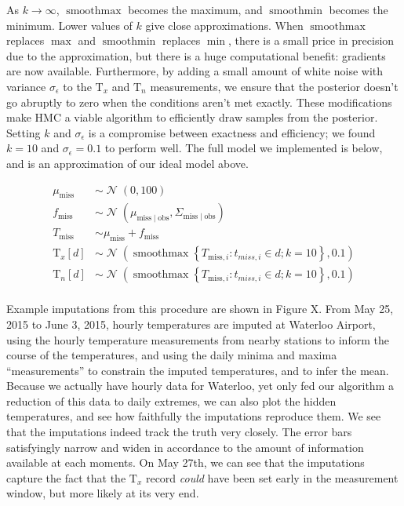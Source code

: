 \documentclass[letter]{article}
\newcommand{\genericdel}[3]{%
      \left#1#3\right#2
    }
\newcommand{\del}[1]{\genericdel(){#1}}
\newcommand{\sbr}[1]{\genericdel[]{#1}}
\newcommand{\cbr}[1]{\genericdel\{\}{#1}}
\DeclareMathOperator{\normal}{\mathcal{N}}
\newcommand{\Tn}{\mathrm{T}_{n}}
\newcommand{\Tx}{\mathrm{T}_{x}}
\newcommand{\miss}{\mathrm{miss}}
\newcommand{\obs}{\mathrm{obs}}
\DeclareMathOperator{\softmax}{smoothmax}
\DeclareMathOperator{\softmin}{smoothmin}
\begin{document}
As \(k \rightarrow \infty\), \(\softmax\) becomes the maximum, and
\(\softmin\) becomes the minimum. Lower values of \(k\) give close
approximations. When \(\softmax\) replaces \(\max\) and \(\softmin\)
replaces \(\min\), there is a small price in precision due to the
approximation, but there is a huge computational benefit: gradients are
now available. Furthermore, by adding a small amount of white noise with
variance \(\sigma_\epsilon\) to the \(\Tx\) and \(\Tn\) measurements, we
ensure that the posterior doesn't go abruptly to zero when the
conditions aren't met exactly. These modifications make HMC a viable
algorithm to efficiently draw samples from the posterior. Setting \(k\)
and \(\sigma_\epsilon\) is a compromise between exactness and
efficiency; we found \(k=10\) and \(\sigma_\epsilon=0.1\) to perform
well. The full model we implemented is below, and is an approximation of
our ideal model above.

\begin{align}
    \mu_\miss &\sim \normal\del{0,100} \\
    f_\miss &\sim \normal\del{\mu_{\miss \mid \obs}, \Sigma_{\miss \mid \obs}} \\
    T_\miss &\sim \mu_\miss + f_\miss \\
    \Tx\sbr{d} &\sim \normal\del{\softmax\cbr{ T_{\miss,i}: t_{miss,i} \in d; k=10}, 0.1} \\
    \Tn\sbr{d} &\sim \normal\del{\softmax\cbr{ T_{\miss,i}: t_{miss,i} \in d; k=10}, 0.1} \\
\end{align}

Example imputations from this procedure are shown in Figure X. From May
25, 2015 to June 3, 2015, hourly temperatures are imputed at Waterloo
Airport, using the hourly temperature measurements from nearby stations
to inform the course of the temperatures, and using the daily minima and
maxima ``measurements'' to constrain the imputed temperatures, and to
infer the mean. Because we actually have hourly data for Waterloo, yet
only fed our algorithm a reduction of this data to daily extremes, we
can also plot the hidden temperatures, and see how faithfully the
imputations reproduce them. We see that the imputations indeed track the
truth very closely. The error bars satisfyingly narrow and widen in
accordance to the amount of information available at each moments. On
May 27th, we can see that the imputations capture the fact that the
\(\Tx\) record \emph{could} have been set early in the measurement
window, but more likely at its very end.
    
\end{document}
